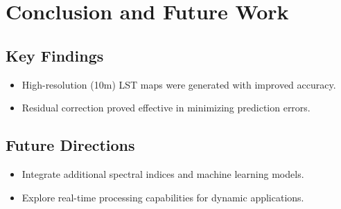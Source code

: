 \documentclass[runningheads,a4paper,11pt]{report}
\begin{document}
\chapter{Conclusion and Future Work}
\section{Key Findings}
\begin{itemize}
    \item High-resolution (10m) LST maps were generated with improved accuracy.
    \item Residual correction proved effective in minimizing prediction errors.
\end{itemize}

\section{Future Directions}
\begin{itemize}
    \item Integrate additional spectral indices and machine learning models.
    \item Explore real-time processing capabilities for dynamic applications.
\end{itemize}
\end{document}
